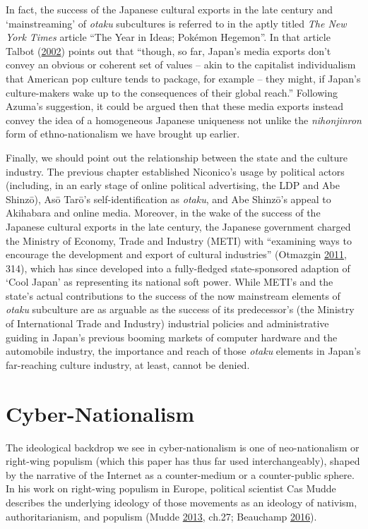 \documentclass[10pt,british,A4paper,twoside]{memoir}
\begin{document}
In fact, the success of the Japanese cultural exports in the late
 century and `mainstreaming' of \emph{otaku} subcultures is
referred to in the aptly titled \emph{The New York Times} article ``The
Year in Ideas; Pokémon Hegemon''. In that article Talbot
(\protect\hyperlink{ref-talbot_year_2002}{2002}) points out that
``though, so far, Japan's media exports don't convey an obvious or
coherent set of values -- akin to the capitalist individualism that
American pop culture tends to package, for example -- they might, if
Japan's culture-makers wake up to the consequences of their global
reach.'' Following Azuma's suggestion, it could be argued then that
these media exports instead convey the idea of a homogeneous Japanese
uniqueness not unlike the \emph{nihonjinron} form of ethno-nationalism
we have brought up earlier.

Finally, we should point out the relationship between the state and the
culture industry. The previous chapter established Niconico's usage by
political actors (including, in an early stage of online political
advertising, the LDP and Abe Shinzō), Asō Tarō's self-identification as
\emph{otaku}, and Abe Shinzō's appeal to Akihabara and online media.
Moreover, in the wake of the success of the Japanese cultural exports in
the late  century, the Japanese government charged the Ministry
of Economy, Trade and Industry (METI) with ``examining ways to encourage
the development and export of cultural industries'' (Otmazgin
\protect\hyperlink{ref-otmazgin_tail_2011}{2011}, 314), which has since
developed into a fully-fledged state-sponsored adaption of `Cool Japan'
as representing its national soft power. While METI's and the state's
actual contributions to the success of the now mainstream elements of
\emph{otaku} subculture are as arguable as the success of its
predecessor's (the Ministry of International Trade and Industry)
industrial policies and administrative guiding in Japan's previous
booming markets of computer hardware and the automobile industry, the
importance and reach of those \emph{otaku} elements in Japan's
far-reaching culture industry, at least, cannot be denied.

\section{Cyber-Nationalism}\label{cyber-nationalism}

The ideological backdrop we see in cyber-nationalism is one of
neo-nationalism or right-wing populism (which this paper has thus far
used interchangeably), shaped by the narrative of the Internet as a
counter-medium or a counter-public sphere. In his work on right-wing
populism in Europe, political scientist Cas Mudde describes the
underlying ideology of those movements as an ideology of nativism,
authoritarianism, and populism (Mudde
\protect\hyperlink{ref-mudde_oxford_2013}{2013}, ch.27; Beauchamp
\protect\hyperlink{ref-beauchamp_expert_2016}{2016}).
\end{document}
